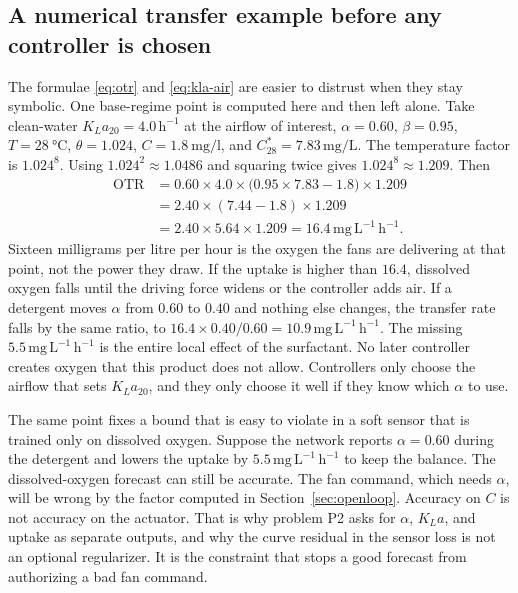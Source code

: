\subsection{A numerical transfer example before any controller is chosen}

The formulae \eqref{eq:otr} and \eqref{eq:kla-air} are easier to distrust when they stay symbolic. One base-regime point is computed here and then left alone. Take clean-water $K_La_{20}=4.0\,\mathrm{h^{-1}}$ at the airflow of interest, $\alpha=0.60$, $\beta=0.95$, $T=\SI{28}{\celsius}$, $\theta=1.024$, $C=\SI{1.8}{\milli\gram\per\litre}$, and $C^{*}_{28}=7.83\,\mathrm{mg/L}$. The temperature factor is $1.024^{8}$. Using $1.024^{2}\approx 1.0486$ and squaring twice gives $1.024^{8}\approx 1.209$. Then
\begin{equation}
\begin{aligned}
\mathrm{OTR}
&=
0.60\times 4.0\times\big(0.95\times 7.83-1.8\big)\times 1.209
\\
&=
2.40\times(7.44-1.8)\times 1.209
\\
&=
2.40\times 5.64\times 1.209
=
16.4\,\mathrm{mg\,L^{-1}\,h^{-1}}.
\end{aligned}
\end{equation}
Sixteen milligrams per litre per hour is the oxygen the fans are delivering at that point, not the power they draw. If the uptake is higher than $16.4$, dissolved oxygen falls until the driving force widens or the controller adds air. If a detergent moves $\alpha$ from $0.60$ to $0.40$ and nothing else changes, the transfer rate falls by the same ratio, to $16.4\times 0.40/0.60=10.9\,\mathrm{mg\,L^{-1}\,h^{-1}}$. The missing $5.5\,\mathrm{mg\,L^{-1}\,h^{-1}}$ is the entire local effect of the surfactant. No later controller creates oxygen that this product does not allow. Controllers only choose the airflow that sets $K_La_{20}$, and they only choose it well if they know which $\alpha$ to use.

The same point fixes a bound that is easy to violate in a soft sensor that is trained only on dissolved oxygen. Suppose the network reports $\alpha=0.60$ during the detergent and lowers the uptake by $5.5\,\mathrm{mg\,L^{-1}\,h^{-1}}$ to keep the balance. The dissolved-oxygen forecast can still be accurate. The fan command, which needs $\alpha$, will be wrong by the factor computed in Section~\ref{sec:openloop}. Accuracy on $C$ is not accuracy on the actuator. That is why problem P2 asks for $\alpha$, $K_La$, and uptake as separate outputs, and why the curve residual in the sensor loss is not an optional regularizer. It is the constraint that stops a good forecast from authorizing a bad fan command.

